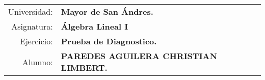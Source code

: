\begin{tabular}{r l }
Universidad: & \textbf{Mayor de San Ándres.}\\
Asignatura: & \textbf{Álgebra Lineal I}\\
Ejercicio: & \textbf{Prueba de Diagnostico.}\\ 
Alumno: & \textbf{PAREDES AGUILERA CHRISTIAN LIMBERT.}
\end{tabular}
\begin{flushleft}
\end{flushleft}

